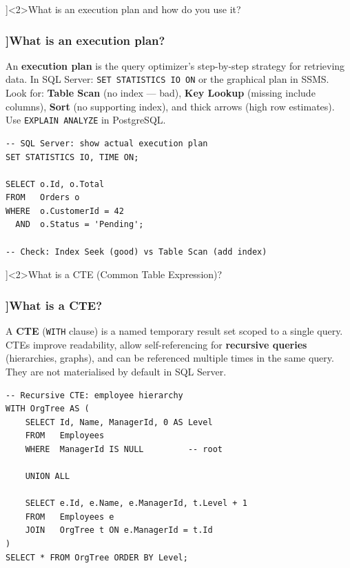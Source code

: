 \QuestionSlide[\CategoryBadge[DbColor!20]{Databases}]<2>{What is an execution plan and how do you use it?}

\begin{frame}[fragile]
  \frametitle{\AnswerTitle[\CategoryBadge[DbColor!20]{Databases}]{What is an execution plan?}}

  {\footnotesize
  An \textbf{execution plan} is the query optimizer's step-by-step strategy for retrieving data. In SQL Server: \texttt{SET STATISTICS IO ON} or the graphical plan in SSMS. Look for: \textbf{Table Scan} (no index — bad), \textbf{Key Lookup} (missing include columns), \textbf{Sort} (no supporting index), and thick arrows (high row estimates). Use \texttt{EXPLAIN ANALYZE} in PostgreSQL.
  }

  \begin{verbatim}
-- SQL Server: show actual execution plan
SET STATISTICS IO, TIME ON;

SELECT o.Id, o.Total
FROM   Orders o
WHERE  o.CustomerId = 42
  AND  o.Status = 'Pending';

-- Check: Index Seek (good) vs Table Scan (add index)
  \end{verbatim}
\end{frame}

\QuestionSlide[\CategoryBadge[DbColor!20]{Databases}]<2>{What is a CTE (Common Table Expression)?}

\begin{frame}[fragile]
  \frametitle{\AnswerTitle[\CategoryBadge[DbColor!20]{Databases}]{What is a CTE?}}

  {\footnotesize
  A \textbf{CTE} (\texttt{WITH} clause) is a named temporary result set scoped to a single query. CTEs improve readability, allow self-referencing for \textbf{recursive queries} (hierarchies, graphs), and can be referenced multiple times in the same query. They are not materialised by default in SQL Server.
  }

  \begin{verbatim}
-- Recursive CTE: employee hierarchy
WITH OrgTree AS (
    SELECT Id, Name, ManagerId, 0 AS Level
    FROM   Employees
    WHERE  ManagerId IS NULL         -- root

    UNION ALL

    SELECT e.Id, e.Name, e.ManagerId, t.Level + 1
    FROM   Employees e
    JOIN   OrgTree t ON e.ManagerId = t.Id
)
SELECT * FROM OrgTree ORDER BY Level;
  \end{verbatim}
\end{frame}


